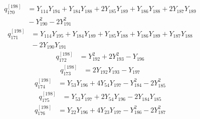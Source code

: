 \begin{equation}\label{q198:row:170}
\begin{aligned}
q_{170}^{[198]} &={} Y_{114}Y_{194} + Y_{184}Y_{188} + 2Y_{185}Y_{189} + Y_{186}Y_{188} + 2Y_{187}Y_{189}\\
&{} - Y_{190}^{2} - 2Y_{191}^{2}
\end{aligned}
\end{equation}
\begin{equation}\label{q198:row:171}
\begin{aligned}
q_{171}^{[198]} &={} Y_{114}Y_{195} + Y_{184}Y_{189} + Y_{185}Y_{188} + Y_{186}Y_{189} + Y_{187}Y_{188}\\
&{} - 2Y_{190}Y_{191}
\end{aligned}
\end{equation}
\begin{equation}\label{q198:row:172}
\begin{aligned}
q_{172}^{[198]} &={} Y_{192}^{2} + 2Y_{193}^{2} - Y_{196}
\end{aligned}
\end{equation}
\begin{equation}\label{q198:row:173}
\begin{aligned}
q_{173}^{[198]} &={} 2Y_{192}Y_{193} - Y_{197}
\end{aligned}
\end{equation}
\begin{equation}\label{q198:row:174}
\begin{aligned}
q_{174}^{[198]} &={} Y_{53}Y_{196} + 4Y_{54}Y_{197} - Y_{184}^{2} - 2Y_{185}^{2}
\end{aligned}
\end{equation}
\begin{equation}\label{q198:row:175}
\begin{aligned}
q_{175}^{[198]} &={} Y_{53}Y_{197} + 2Y_{54}Y_{196} - 2Y_{184}Y_{185}
\end{aligned}
\end{equation}
\begin{equation}\label{q198:row:176}
\begin{aligned}
q_{176}^{[198]} &={} Y_{22}Y_{196} + 4Y_{23}Y_{197} - Y_{186}^{2} - 2Y_{187}^{2}
\end{aligned}
\end{equation}
